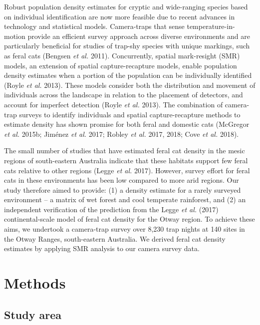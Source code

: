 \documentclass[11pt,a4paper,titlepage,twoside,openright]{style/unimelbthesis}
\begin{document}
\begin{mainmatter}
Robust population density estimates for cryptic and wide-ranging species based on individual identification are now more feasible due to recent advances in technology and statistical models. Camera-traps that sense temperature-in-motion provide an efficient survey approach across diverse environments and are particularly beneficial for studies of trap-shy species with unique markings, such as feral cats (Bengsen \emph{et al.} 2011). Concurrently, spatial mark-resight (SMR) models, an extension of spatial capture-recapture models, enable population density estimates when a portion of the population can be individually identified (Royle \emph{et al.} 2013). These models consider both the distribution and movement of individuals across the landscape in relation to the placement of detectors, and account for imperfect detection (Royle \emph{et al.} 2013). The combination of camera-trap surveys to identify individuals and spatial capture-recapture methods to estimate density has shown promise for both feral and domestic cats (McGregor \emph{et al.} 2015b; Jiménez \emph{et al.} 2017; Robley \emph{et al.} 2017, 2018; Cove \emph{et al.} 2018).

The small number of studies that have estimated feral cat density in the mesic regions of south-eastern Australia indicate that these habitats support few feral cats relative to other regions (Legge \emph{et al.} 2017). However, survey effort for feral cats in these environments has been low compared to more arid regions. Our study therefore aimed to provide: (1) a density estimate for a rarely surveyed environment -- a matrix of wet forest and cool temperate rainforest, and (2) an independent verification of the prediction from the Legge \emph{et al.} (2017) continental-scale model of feral cat density for the Otway region. To achieve these aims, we undertook a camera-trap survey over 8,230 trap nights at 140 sites in the Otway Ranges, south-eastern Australia. We derived feral cat density estimates by applying SMR analysis to our camera survey data.

\newpage

\hypertarget{methods}{%
\section{Methods}\label{methods}}

\hypertarget{study-area}{%
\subsection{Study area}\label{study-area}}


\end{mainmatter}
\end{document}
